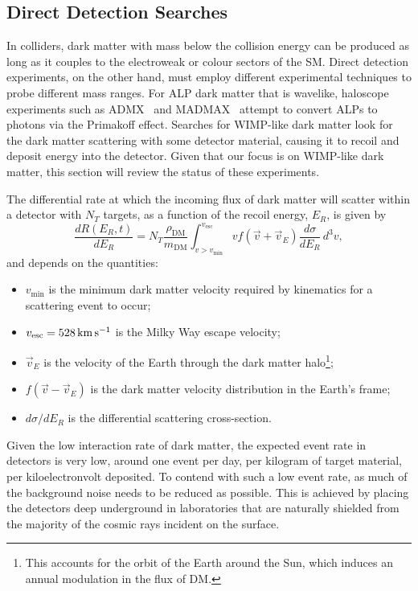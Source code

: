 \subsection{Direct Detection Searches}
In colliders, dark matter with mass below the collision energy can be produced as long as it couples to the electroweak or colour sectors of the SM. Direct detection experiments, on the other hand, must employ different experimental techniques to probe different mass ranges. 
For ALP dark matter that is wavelike, haloscope experiments 
such as ADMX~\cite{ADMX:2009iij_SQUIDbasedmicrowavecavity} and MADMAX~\cite{MADMAX:2019pub_mar_Newexperimentalapproach} 
attempt to convert ALPs to photons via the Primakoff effect. 
Searches for WIMP-like dark matter look for the dark matter scattering with some detector
material, causing it to recoil and deposit energy into the detector. Given that our focus is on WIMP-like dark matter, 
this section will review the status of these experiments.

The differential rate at which the incoming flux of dark matter will scatter
within a detector with $N_T$ targets, as a function of the recoil energy, $E_R$,
is given by
\begin{equation}
    \frac{d R(E_R, t)}{dE_R} = N_T \frac{\rho_\mathrm{DM}}{m_\mathrm{DM}}\int_{v>v_\mathrm{min}}^{v_\mathrm{esc}}v f(\Vec{v} + \vec{v}_E)\frac{d\sigma}{dE_R}\,d^3v,
    \label{ch1:eq:DD_rate}
\end{equation}
 and depends on the quantities:
\begin{itemize}
    \item $v_\mathrm{min}$ is the minimum dark matter velocity required by kinematics for a scattering event to occur;
    \item $v_\mathrm{esc} = 528{\rm \,km}{\rm \,s}^{-1}$ is the Milky Way escape velocity;
    \item $\vec{v}_E$ is the velocity of the Earth through the dark matter halo\footnote{This accounts for the orbit of the Earth around the Sun, which induces an annual modulation in the flux of DM.};
    \item $f(\vec{v} - \vec{v}_E)$ is the dark matter velocity distribution in the Earth's frame;
    \item $d\sigma/dE_R$ is the differential scattering cross-section.
\end{itemize}
Given the low interaction rate of dark matter, the expected event rate in detectors is very low, around one event per day, per kilogram of target material, per kiloelectronvolt deposited. To contend with such a low event rate, as much of the background noise needs to be reduced as possible. This is achieved by placing the detectors deep underground in laboratories that are naturally shielded from the majority of the cosmic rays incident on the surface. 

